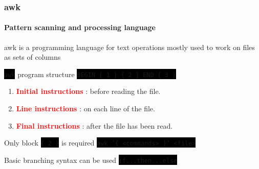 \documentclass[unknownkeysallowed, 10pt, a4 paper, handout]{beamer}
\newcommand{\focus}[1]{\textbf{\textcolor{red}{#1}}}
\newcommand{\code}[1]{\colorbox{black}{\color{green}\texttt{#1}}}
\begin{document}
\begin{frame}
  \frametitle{awk}
  \framesubtitle{Pattern scanning and processing language}

  \begin{block}{}
    awk is a programming language for text operations mostly used to work
      on files as sets of columns
  \end{block}

  \begin{exampleblock}{\code{awk} program structure}
    \code{BEGIN \{ 1 \} \{ 2 \} END \{ 3 \}} \\
    \begin{enumerate}
      \item \focus{Initial instructions} : before reading the file.
      \item \focus{Line instructions} : on each line of the file.
      \item \focus{Final instructions} : after the file has been read.
    \end{enumerate}
  \end{exampleblock}

  \begin{alertblock}{Only block \code{\{ 2 \}} is required}
    \code{awk '\{ <commands> \}' <file>}
  \end{alertblock}
  \begin{alertblock}{Basic branching syntax can be used}
    \code{if...then...else}
  \end{alertblock}
\end{frame}
\end{document}
